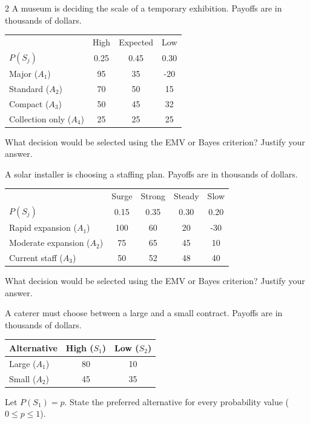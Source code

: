 \begin{multicols}{2}
		A museum is deciding the scale of a temporary exhibition. Payoffs are in thousands of dollars.
		\begin{center}\setlength{\tabcolsep}{2pt}\renewcommand{\arraystretch}{1.15}
			\begin{tabular}{lccc}\toprule
			&High&Expected&Low\\
			$P(S_j)$&0.25&0.45&0.30\\ \midrule
			Major ($A_1$)&95&35&-20\\
			Standard ($A_2$)&70&50&15\\
			Compact ($A_3$)&50&45&32\\
			Collection only ($A_4$)&25&25&25\\ \bottomrule
			\end{tabular}
		\end{center}\vspace{-3mm}
		What decision would be selected using the EMV or Bayes criterion? Justify your answer.

		A solar installer is choosing a staffing plan. Payoffs are in thousands of dollars.
		\begin{center}\setlength{\tabcolsep}{1.5pt}\renewcommand{\arraystretch}{1.15}
			\begin{tabular}{lcccc}\toprule
			&Surge&Strong&Steady&Slow\\
			$P(S_j)$&0.15&0.35&0.30&0.20\\ \midrule
			Rapid expansion ($A_1$)&100&60&20&-30\\
			Moderate expansion ($A_2$)&75&65&45&10\\
			Current staff ($A_3$)&50&52&48&40\\ \bottomrule
			\end{tabular}
		\end{center}\vspace{-3mm}
		What decision would be selected using the EMV or Bayes criterion? Justify your answer.

		A caterer must choose between a large and a small contract. Payoffs are in thousands of dollars.
		\begin{center}\setlength{\tabcolsep}{4pt}\renewcommand{\arraystretch}{1.15}
			\begin{tabular}{lcc}\toprule
			Alternative&High ($S_1$)&Low ($S_2$)\\ \midrule
			Large ($A_1$)&80&10\\
			Small ($A_2$)&45&35\\ \bottomrule
			\end{tabular}
		\end{center}\vspace{-3mm}
		Let $P(S_1)=p$. State the preferred alternative for every probability value ($0\le p\le1$).


\end{multicols}
